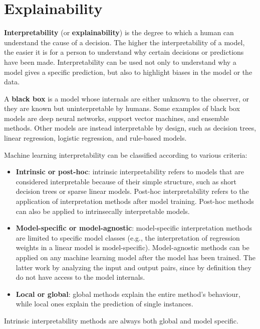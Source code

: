 \chapter{Explainability}

\textbf{Interpretability} (or \textbf{explainability}) is the degree to which a human can understand the cause of a decision. The higher the interpretability of a model, the easier it is for a person to understand why certain decisions or predictions have been made. Interpretability can be used not only to understand why a model gives a specific prediction, but also to highlight biases in the model or the data.

A \textbf{black box} is a model whose internals are either unknown to the observer, or they are known but uninterpretable by humans. Some examples of black box models are deep neural networks, support vector machines, and ensemble methods. Other models are instead interpretable by design, such as decision trees, linear regression, logistic regression, and rule-based models.

Machine learning interpretability can be classified according to various criteria:
\begin{itemize}
    \item \textbf{Intrinsic or post-hoc}: intrinsic interpretability refers to models that are considered interpretable because of their simple structure, such as short decision trees or sparse linear models. Post-hoc interpretability refers to the application of interpretation methods after model training. Post-hoc methods can also be applied to intrinsecally interpretable models.
    
    \item \textbf{Model-specific or model-agnostic}: model-specific interpretation methods are limited to specific model classes (e.g., the interpretation of regression weights in a linear model is model-specific). Model-agnostic methods can be applied on any machine learning model after the model has been trained. The latter work by analyzing the input and output pairs, since by definition they do not have access to the model internals.
    
    \item \textbf{Local or global}: global methods explain the entire method's behaviour, while local ones explain the prediction of single instances.
\end{itemize}
Intrinsic interpretability methods are always both global and model specific.

